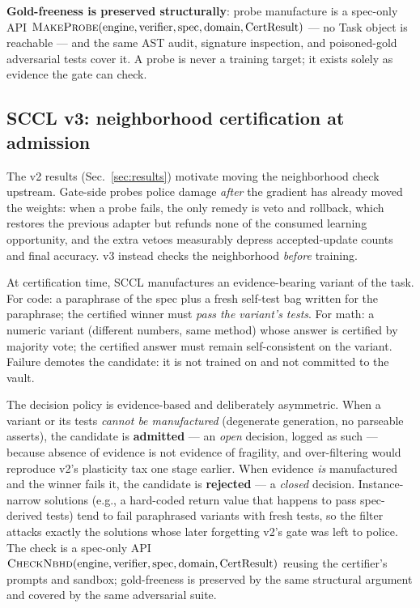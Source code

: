 \documentclass[10pt,conference]{IEEEtran}
\begin{document}
\textbf{Gold-freeness is preserved structurally}: probe manufacture is a spec-only API $\textsc{MakeProbe}(\text{engine}, \text{verifier}, \text{spec}, \text{domain}, \text{CertResult})$ --- no Task object is reachable --- and the same AST audit, signature inspection, and poisoned-gold adversarial tests cover it. A probe is never a training target; it exists solely as evidence the gate can check.

\subsection{SCCL v3: neighborhood certification at admission}
\label{sec:v3}
The v2 results (Sec.~\ref{sec:results}) motivate moving the neighborhood check upstream. Gate-side probes police damage \emph{after} the gradient has already moved the weights: when a probe fails, the only remedy is veto and rollback, which restores the previous adapter but refunds none of the consumed learning opportunity, and the extra vetoes measurably depress accepted-update counts and final accuracy. v3 instead checks the neighborhood \emph{before} training.

At certification time, SCCL manufactures an evidence-bearing variant of the task. For code: a paraphrase of the spec plus a fresh self-test bag written for the paraphrase; the certified winner must \emph{pass the variant's tests}. For math: a numeric variant (different numbers, same method) whose answer is certified by majority vote; the certified answer must remain self-consistent on the variant. Failure demotes the candidate: it is not trained on and not committed to the vault.

The decision policy is evidence-based and deliberately asymmetric. When a variant or its tests \emph{cannot be manufactured} (degenerate generation, no parseable asserts), the candidate is \textbf{admitted} --- an \emph{open} decision, logged as such --- because absence of evidence is not evidence of fragility, and over-filtering would reproduce v2's plasticity tax one stage earlier. When evidence \emph{is} manufactured and the winner fails it, the candidate is \textbf{rejected} --- a \emph{closed} decision. Instance-narrow solutions (e.g., a hard-coded return value that happens to pass spec-derived tests) tend to fail paraphrased variants with fresh tests, so the filter attacks exactly the solutions whose later forgetting v2's gate was left to police. The check is a spec-only API $\textsc{CheckNbhd}(\text{engine}, \text{verifier}, \text{spec}, \text{domain}, \text{CertResult})$ reusing the certifier's prompts and sandbox; gold-freeness is preserved by the same structural argument and covered by the same adversarial suite.
\end{document}

